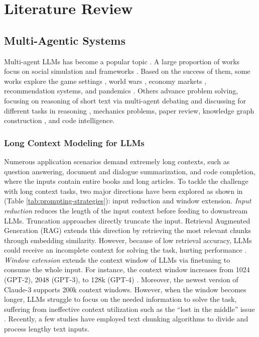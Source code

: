 \chapter{Literature Review}

\section{Multi-Agentic Systems}

 Multi-agent LLMs has become a popular topic \cite{guo2024largelanguagemodelbased}. A large proportion of works focus on social simulation \cite{park2023generativeagentsinteractivesimulacra} and frameworks \cite{li2023camelcommunicativeagentsmind}. Based on the success of them, some
 works explore the game settings \cite{light2023avalonbenchevaluatingllmsplaying}, world wars \cite{hua2024warpeacewaragentlarge}, economy markets \cite{li2024econagentlargelanguagemodelempowered}, recommendation systems\cite{zhang2024generativeagentsrecommendation}, and pandemics \cite{Ghaffarzadegan_2024}. Others advance problem solving, focusing on reasoning of short text via multi-agent debating and discussing for different tasks in reasoning \cite{du2023improving, Xiong_2023, tang2024medagentslargelanguagemodels}, mechanics problems, paper review, knowledge graph construction \cite{ye2024isolationmultiagentsynergyimproving}, and code intelligence.

\subsection{Long Context Modeling for LLMs} 

Numerous application scenarios demand extremely long contexts, such as question answering, document and dialogue summarization, and code completion, where the inputs contain entire books and long articles. To tackle the challenge with long context tasks, two major directions have been explored as shown in (Table \ref{tab:prompting-strategies}): input reduction and window extension. \textit{Input reduction} reduces the length of the input context before feeding to downstream LLMs. Truncation approaches directly truncate the input. Retrieval Augmented Generation (RAG)  \cite{xu2024retrievalmeetslongcontext} extends this direction by retrieving the most relevant chunks through embedding similarity. However, because of low retrieval accuracy, LLMs could receive an incomplete context for solving the task, hurting performance \cite{yan2024correctiveretrievalaugmentedgeneration}. \textit{Window extension} extends the context window of LLMs via finetuning to consume the whole input. For instance, the context window increases from 1024 (GPT-2), 2048 (GPT-3), to 128k (GPT-4) \cite{openai2024gpt4technicalreport, Radford2019LanguageMA}. Moreover, the newest version of Claude-3 \cite{claude} supports 200k context windows. However, when the window becomes longer, LLMs struggle to focus on the needed information to solve the task, suffering from ineffective context utilization such as the “lost in the middle” issue \cite{liu2023lostmiddlelanguagemodels}. Recently, a few studies have employed text chunking algorithms to divide and process lengthy text inputs.
 
